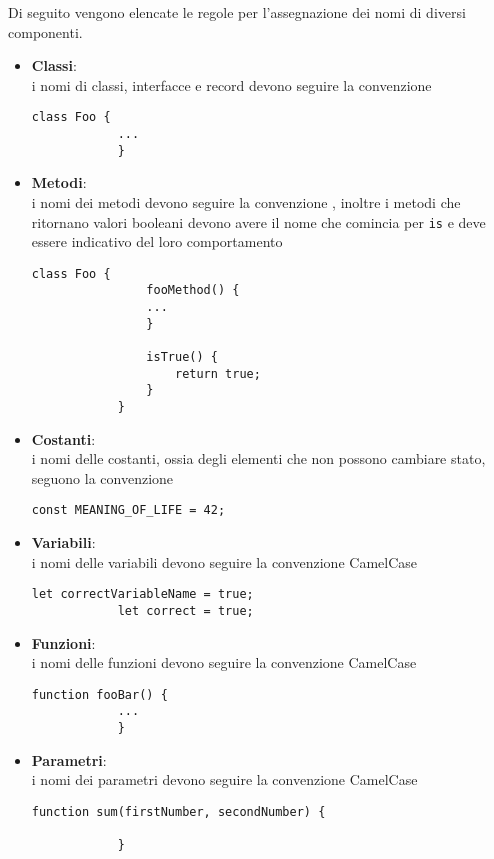 Di seguito vengono elencate le regole per l'assegnazione dei nomi di diversi componenti.
\begin{itemize}
	\item \textbf{Classi}:\\
		i nomi di classi, interfacce e record devono seguire la convenzione  \\
        \begin{lstlisting}[style=htmlcssjs]
			class Foo {
			...
			}
		\end{lstlisting}

    \item \textbf{Metodi}:\\
    	i nomi dei metodi devono seguire la convenzione , inoltre i metodi che ritornano valori booleani devono avere il 
    	nome che comincia per \texttt{is} e deve essere indicativo del loro comportamento\\
		\begin{lstlisting}[style=htmlcssjs]
			class Foo {
				fooMethod() {
				...
				}

				isTrue() {
					return true;
				}
			}
		\end{lstlisting}

	\item \textbf{Costanti}:\\
		i nomi delle costanti, ossia degli elementi che non possono cambiare stato, seguono la convenzione 
		 \\
		\begin{lstlisting}[style=htmlcssjs]
			const MEANING_OF_LIFE = 42;
		\end{lstlisting}

    \item \textbf{Variabili}:\\
		i nomi delle variabili devono seguire la convenzione CamelCase \\
		\begin{lstlisting}[style=htmlcssjs]
			let correctVariableName = true;
			let correct = true;
		\end{lstlisting}

	\item \textbf{Funzioni}:\\
		i nomi delle funzioni devono seguire la convenzione CamelCase \\

		\begin{lstlisting}[style=htmlcssjs]
			function fooBar() {
			...
			}
		\end{lstlisting}
	\item \textbf{Parametri}:\\
		i nomi dei parametri devono seguire la convenzione CamelCase \\

		\begin{lstlisting}[style=htmlcssjs]
			function sum(firstNumber, secondNumber) {

			}
		\end{lstlisting}

	\end{itemize}

